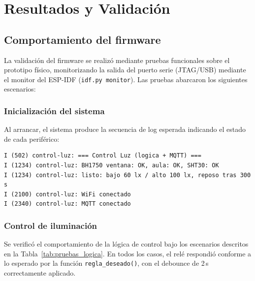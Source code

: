 
\section{Resultados y Validación}
\label{sec:resultados}

\subsection{Comportamiento del firmware}

La validación del firmware se realizó mediante pruebas funcionales sobre el
prototipo físico, monitorizando la salida del puerto serie (JTAG/USB) mediante
el monitor del ESP-IDF (\texttt{idf.py monitor}). Las pruebas abarcaron los
siguientes escenarios:

\subsubsection{Inicialización del sistema}

Al arrancar, el sistema produce la secuencia de log esperada indicando el estado de
cada periférico:

\begin{lstlisting}[caption={Log de inicialización del firmware (extracto representativo).}, label={lst:log_init}]
I (502) control-luz: === Control Luz (logica + MQTT) ===
I (1234) control-luz: BH1750 ventana: OK, aula: OK, SHT30: OK
I (1234) control-luz: listo: bajo 60 lx / alto 100 lx, reposo tras 300 s
I (2100) control-luz: WiFi conectado
I (2340) control-luz: MQTT conectado
\end{lstlisting}

\subsubsection{Control de iluminación}

Se verificó el comportamiento de la lógica de control bajo los escenarios descritos
en la Tabla~\ref{tab:pruebas_logica}. En todos los casos, el relé respondió
conforme a lo esperado por la función \texttt{regla\_deseado()}, con el debounce
de 2\,s correctamente aplicado.


